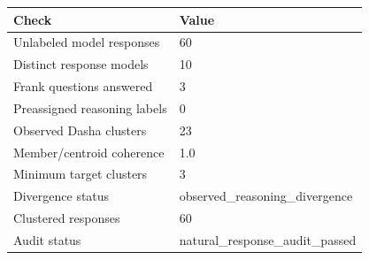 \begin{tabular}{ll}
\toprule
Check & Value \\
\midrule
Unlabeled model responses & 60 \\
Distinct response models & 10 \\
Frank questions answered & 3 \\
Preassigned reasoning labels & 0 \\
Observed Dasha clusters & 23 \\
Member/centroid coherence & 1.0 \\
Minimum target clusters & 3 \\
Divergence status & observed\_reasoning\_divergence \\
Clustered responses & 60 \\
Audit status & natural\_response\_audit\_passed \\
\bottomrule
\end{tabular}
